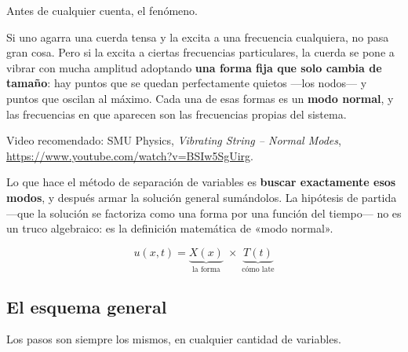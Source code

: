 \documentclass[
  spanish,
  a4paper,
]{scrbook}
\theoremstyle{definition}
\theoremstyle{plain}
\theoremstyle{definition}
\theoremstyle{plain}
\theoremstyle{definition}
\theoremstyle{remark}
\begin{document}
Antes de cualquier cuenta, el fenómeno.

Si uno agarra una cuerda tensa y la excita a una frecuencia cualquiera,
no pasa gran cosa. Pero si la excita a ciertas frecuencias particulares,
la cuerda se pone a vibrar con mucha amplitud adoptando \textbf{una
forma fija que solo cambia de tamaño}: hay puntos que se quedan
perfectamente quietos ---los nodos--- y puntos que oscilan al máximo.
Cada una de esas formas es un \textbf{modo normal}, y las frecuencias en
que aparecen son las frecuencias propias del sistema.

Video recomendado: SMU Physics, \emph{Vibrating String -- Normal Modes},
\url{https://www.youtube.com/watch?v=BSIw5SgUirg}.

Lo que hace el método de separación de variables es \textbf{buscar
exactamente esos modos}, y después armar la solución general sumándolos.
La hipótesis de partida ---que la solución se factoriza como una forma
por una función del tiempo--- no es un truco algebraico: es la
definición matemática de «modo normal».

\[
u(x,t) = \underbrace{X(x)}_{\text{la forma}} \;\times\; \underbrace{T(t)}_{\text{cómo late}}
\]

\subsection{El esquema general}\label{sec-esquema-separacion}

Los pasos son siempre los mismos, en cualquier cantidad de variables.
\end{document}
